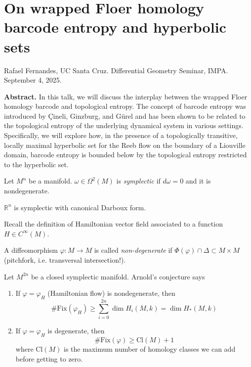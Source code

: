 \section{On wrapped Floer homology barcode
entropy and hyperbolic sets}
\label{section-wrapp-floer-homol-barco}

\noindent
Rafael Fernandes, UC Santa Cruz.
Differential Geometry Seminar, IMPA.
September 4, 2025.

\medskip\noindent
{\bf Abstract.} In this talk, we will discuss
the interplay between the
wrapped Floer homology barcode and
topological entropy. The concept of barcode
entropy was introduced by Çineli, Ginzburg,
and Gürel and has been shown to be
related to the topological entropy of the
underlying dynamical system in various
settings. Specifically, we will explore how,
in the presence of a topologically
transitive, locally maximal hyperbolic set
for the Reeb flow on the boundary of
a Liouville domain, barcode entropy is
bounded below by the topological entropy
restricted to the hyperbolic set.

\medskip\noindent

Let $M^n$ be a manifold.
$\omega \in \Omega^2(M)$ is {\it symplectic}
if $d \omega=0$ and it is
nondegenerate.

\begin{example}
\label{example-Rn-is-symplectic}
$\mathbb{R}^n$ is symplectic with canonical
Darboux form.
\end{example}

Recall the definition of Hamiltonian vector
field
associated to a function $H \in C^\infty(M)$.

\begin{definition}
\label{definition-nonde-diffe}
A diffeomorphism $\varphi:M \to M$ is called
{\it non-degenerate} if
$\Phi(\varphi)\cap\Delta \subset M\times M$
(pitchfork, i.e. transversal intersection!).
\end{definition}

Let $M^{2n}$ be a closed symplectic manifold.
Arnold's conjecture says
\begin{enumerate}
\item If $\varphi=\varphi_H$ (Hamiltonian
flow) is nondegenerate, then
$$
\# \text{Fix}(\varphi_H) \geq
\sum_{i=0}^{2n}\dim H_i(M,k)=\dim H_*(M,k)
$$
\item If $\varphi=\varphi_H$ is degenerate,
then
$$
\# \text{Fix}(\varphi)\geq \text{Cl}(M)+1
$$
where $\text{Cl}(M)$ is the maximum number of
homology classes
we can add before getting to zero.
\end{enumerate}

